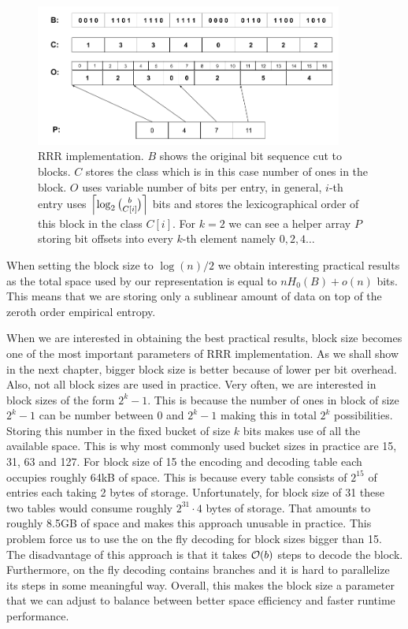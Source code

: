 \begin{figure}
	\centerline{
		\includegraphics[width=0.9\textwidth, height=0.3\textheight]{images/rrr}
	}
	\caption[TODO]{RRR implementation. $B$ shows the original bit sequence cut to
    blocks. $C$ stores the class which is in this case number of ones in the block.
    $O$ uses variable number of bits per entry, in general, $i$-th entry uses
    $\left\lceil \log_2{b\choose C[i]} \right\rceil$ bits and stores the lexicographical order
    of this block in the class $C[i]$. For $k=2$ we can see a helper array $P$
    storing bit offsets into every $k$-th element namely $0, 2, 4\ldots$
	}
	\label{obr:RRRFinal}
\end{figure}

When setting the block size to $\log(n)/2$ we obtain interesting practical results as
the total space used by our representation is equal to $nH_0(B) + o(n)$ bits. This means
that we are storing only a sublinear amount of data on top of the zeroth order empirical entropy.

When we are interested in obtaining the best practical results, block size becomes
one of the most important parameters of RRR implementation. As we shall show in the next
chapter, bigger block size is better because of lower per bit overhead. Also, not all block
sizes are used in practice. Very often, we are interested in block sizes of the form $2^k-1$.
This is because the number of ones in block of size $2^k-1$ can be number between 0 and $2^k-1$
making this in total $2^k$ possibilities. Storing this number in the fixed bucket of size
$k$ bits makes use of all the available space. This is why most commonly used bucket sizes in
practice are 15, 31, 63 and 127. For block size of 15 the encoding and decoding table
each occupies roughly 64kB of space. This is because every table consists of $2^{15}$ of entries
each taking 2 bytes of storage. Unfortunately, for block size of 31 these two tables would consume
roughly $2^{31}\cdot 4$ bytes of storage. That amounts to roughly 8.5GB of space and makes this approach
unusable in practice. This problem force us to use the on the fly decoding for block sizes
bigger than 15. The disadvantage of this approach is that it takes $\mathcal{O}(b)$ steps to decode the block.
Furthermore, on the fly decoding contains branches and it is hard to parallelize its steps in some meaningful
way. Overall, this makes the block size a parameter that we can adjust to balance between better space
efficiency and faster runtime performance.

